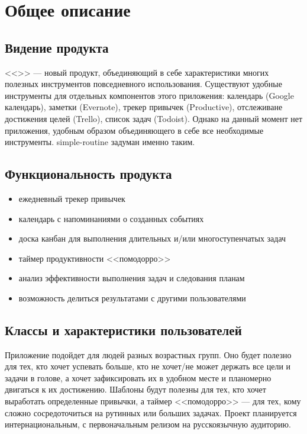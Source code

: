 \chapter{Общее описание}
\label{ch:description}
\section{Видение продукта}
<<\vProjectName>>  --- новый продукт, объединяющий в себе характеристики многих полезных инструментов повседневного использования. Существуют удобные инструменты для отдельных компонентов этого приложения: календарь (Google календарь), заметки (Evernote), трекер привычек (Productive), отслеживане достижения целей (Trello), список задач (Todoist). Однако на данный момент нет приложения, удобным образом объединяющего в себе все необходимые инструменты. simple-routine задуман именно таким.


\section{Функциональность продукта}
\begin{itemize}
    \item ежедневный трекер привычек
    \item календарь с напоминаниями о созданных событиях
    \item доска канбан для выполнения длительных и/или многоступенчатых задач
    \item таймер продуктивности <<помодорро>>
    \item анализ эффективности выполнения задач и следования планам
    \item возможность делиться результатами с другими пользователями
\end{itemize}


\section{Классы и характеристики пользователей}
Приложение подойдет для людей разных возрастных групп. Оно будет полезно для тех, кто хочет успевать больше, кто не хочет/не может держать все цели и задачи в голове, а хочет зафиксировать их в удобном месте и планомерно двигаться к их достижению. Шаблоны будут полезны для тех, кто хочет выработать определенные привычки, а таймер <<помодорро>> --- для тех, кому сложно сосредоточиться на рутинных или больших задачах. Проект планируется интернациональным, с первоначальным релизом на русскоязычную аудиторию.

